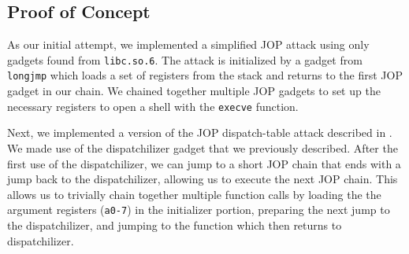 \subsection{Proof of Concept}

As our initial attempt, we implemented a simplified JOP attack using only
gadgets found from \verb|libc.so.6|. The attack is initialized by a gadget from
\verb|longjmp| which loads a set of registers from the stack and returns to the
first JOP gadget in our chain. We chained together multiple JOP gadgets to set
up the necessary registers to open a shell with the \verb|execve| function.

Next, we implemented a version of the JOP dispatch-table attack described in
\cite{bletsch11jopx86}. We made use of the dispatchilizer gadget that we
previously described. After the first use of the dispatchilizer, we can jump to
a short JOP chain that ends with a jump back to the dispatchilizer, allowing us
to execute the next JOP chain. This allows us to trivially chain together
multiple function calls by loading the the argument registers (\verb|a0-7|) in
the initializer portion, preparing the next jump to the dispatchilizer, and
jumping to the function which then returns to dispatchilizer. 

